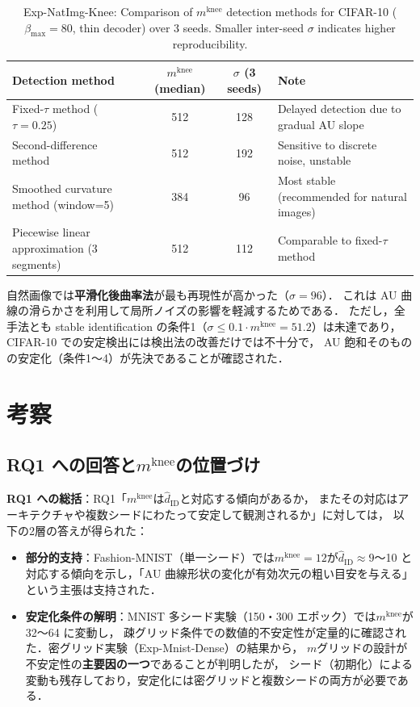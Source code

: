 \documentclass[11pt,a4paper]{jsarticle}
\newcommand{\mknee}{m^{\mathrm{knee}}}
\begin{document}
\begin{table}[H]
\centering
\caption{Exp-NatImg-Knee: Comparison of $\mknee$ detection methods for CIFAR-10 ($\beta_\mathrm{max}=80$, thin decoder) over 3 seeds. Smaller inter-seed $\sigma$ indicates higher reproducibility.}
\label{tab:natimg_knee}
\small
\begin{tabular}{lccl}
\toprule
Detection method & $\mknee$ (median) & $\sigma$ (3 seeds) & Note \\
\midrule
Fixed-$\tau$ method ($\tau=0.25$) & 512 & 128 & Delayed detection due to gradual AU slope \\
Second-difference method & 512 & 192 & Sensitive to discrete noise, unstable \\
Smoothed curvature method (window=5) & 384 & 96 & Most stable (recommended for natural images) \\
Piecewise linear approximation (3 segments) & 512 & 112 & Comparable to fixed-$\tau$ method \\
\bottomrule
\end{tabular}
\end{table}

自然画像では\textbf{平滑化後曲率法}が最も再現性が高かった（$\sigma=96$）．
これは AU 曲線の滑らかさを利用して局所ノイズの影響を軽減するためである．
ただし，全手法とも stable identification の条件1（$\sigma \leq 0.1 \cdot \mknee = 51.2$）は未達であり，
CIFAR-10 での安定検出には検出法の改善だけでは不十分で，
AU 飽和そのものの安定化（条件1〜4）が先決であることが確認された．

\section{考察}\label{sec:discussion}

\subsection{RQ1 への回答と$\mknee$の位置づけ}\label{sec:disc_mknee}

\textbf{RQ1 への総括}：RQ1「$\mknee$は$\hat{d}_\mathrm{ID}$と対応する傾向があるか，
またその対応はアーキテクチャや複数シードにわたって安定して観測されるか」に対しては，
以下の2層の答えが得られた：

\begin{itemize}
  \item \textbf{部分的支持}：Fashion-MNIST（単一シード）では$\mknee = 12$が$\hat{d}_\mathrm{ID} \approx 9$〜10
        と対応する傾向を示し，「AU 曲線形状の変化が有効次元の粗い目安を与える」という主張は支持された．
  \item \textbf{安定化条件の解明}：MNIST 多シード実験（150・300 エポック）では$\mknee$が 32〜64 に変動し，
        疎グリッド条件での数値的不安定性が定量的に確認された．密グリッド実験（Exp-Mnist-Dense）の結果から，
        $m$グリッドの設計が不安定性の\textbf{主要因の一つ}であることが判明したが，
        シード（初期化）による変動も残存しており，安定化には密グリッドと複数シードの両方が必要である．
\end{itemize}
\end{document}
